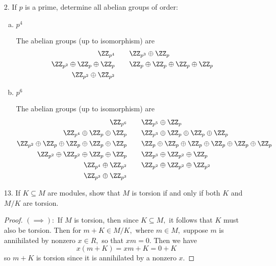 \documentclass{article}
\begin{document}
\begin{itemize}
	\item[2.] If $p$ is a prime, determine all abelian groups of order:
		\begin{enumerate}[(a)]
			\item $p^4$
				\begin{soln}
					The abelian groups (up to isomorphism) are
					\begin{align*}
						\ZZ_{p^4} & \quad\quad \ZZ_{p^3}\oplus \ZZ_{p} \\
					 	\ZZ_{p^2}\oplus\ZZ_p\oplus\ZZ_{p} &\quad\quad \ZZ_p\oplus\ZZ_p\oplus\ZZ_p\oplus\ZZ_p \\
						\ZZ_{p^2}\oplus\ZZ_{p^2}
					\end{align*}
				\end{soln}

			\item $p^6$
				\begin{soln}
					The abelian groups (up to isomorphism) are
					\begin{align*}
						\ZZ_{p^6} & \quad\quad \ZZ_{p^5}\oplus \ZZ_{p} \\
						\ZZ_{p^4}\oplus\ZZ_p\oplus \ZZ_{p} &\quad\quad \ZZ_{p^3}\oplus\ZZ_p\oplus\ZZ_p\oplus\ZZ_{p} \\
						\ZZ_{p^2}\oplus\ZZ_p\oplus\ZZ_p\oplus\ZZ_p\oplus\ZZ_{p} &\quad\quad \ZZ_p\oplus\ZZ_p\oplus \ZZ_p\oplus \ZZ_p\oplus \ZZ_p\oplus \ZZ_p\\
						\ZZ_{p^2}\oplus\ZZ_{p^2}\oplus\ZZ_{p}\oplus\ZZ_{p} &\quad\quad \ZZ_{p^3}\oplus\ZZ_{p^2}\oplus\ZZ_{p} \\
						\ZZ_{p^4}\oplus\ZZ_{p^2} &\quad\quad \ZZ_{p^2}\oplus\ZZ_{p^2}\oplus\ZZ_{p^2} \\
						\ZZ_{p^3}\oplus\ZZ_{p^3}
					\end{align*}
				\end{soln}
				
		\end{enumerate}

	\item[13.] If $K\subseteq M$ are modules, show that $M$ is torsion if and only if both $K$ and $M/K$ are torsion.
		\begin{proof}
			$(\implies):$ If $M$ is torsion, then since $K\subseteq M,$ it follows that $K$ must also be torsion. Then for $m+K\in M/K,$ where $m\in M,$ suppose $m$ is annihilated by nonzero $x\in R,$ so that $xm=0.$ Then we have
			\[x(m+K)=xm+K=0+K\]
			so $m+K$ is torsion since it is annihilated by a nonzero $x.$


\end{proof}
\end{itemize}
\end{document}
